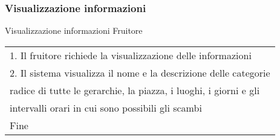 \begin{minipage}{\textwidth}
    \subsubsection{Visualizzazione informazioni}
    \usecase
        {Visualizzazione informazioni}
        {
            Fruitore
        }
        {
            \begin{tabular}{l}
                1. Il fruitore richiede la visualizzazione delle informazioni\\
                2. Il sistema visualizza il nome e la descrizione delle categorie\\
                radice di tutte le gerarchie, la piazza, i luoghi, i giorni e gli\\
                intervalli orari in cui sono possibili gli scambi\\
                Fine
            \end{tabular}

        }
        \vspace{0.5cm}
\end{minipage}